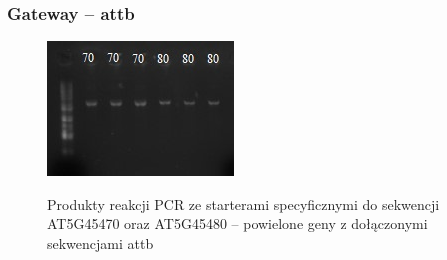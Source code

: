 \documentclass{beamer}
\begin{document}
\begin{frame}
    \frametitle{Gateway -- attb}
    \begin{figure}
        \centering
        \includegraphics[scale=1.4]{zel1.jpg}\\
        \caption*\hfill{Produkty reakcji PCR ze starterami specyficznymi do sekwencji AT5G45470 oraz AT5G45480 -- powielone geny z dołączonymi sekwencjami attb}%
    \end{figure}
\end{frame}
\end{document}
